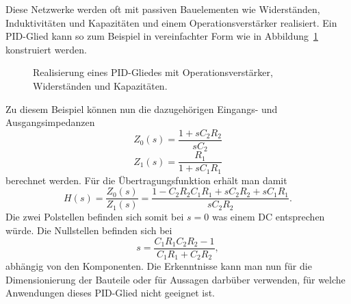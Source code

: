 Diese Netzwerke werden oft mit passiven Bauelementen wie Widerständen, Induktivitäten und Kapazitäten und einem Operationsverstärker realisiert.
%
%
%
%
%
Ein PID-Glied kann so zum Beispiel in vereinfachter Form wie in
%
Abbildung~\ref{pade:pid-circuit} konstruiert werden.
\begin{figure}
\centering
	\tikzset{>=latex}
\caption{Realisierung eines PID-Gliedes mit Operationsverstärker,
Widerständen und Kapazitäten.
\label{pade:pid-circuit}}
\end{figure}
Zu diesem Beispiel können nun die dazugehörigen Eingangs- und
Ausgangsimpedanzen
%
%
%
\begin{equation*}
Z_{0}(s)
=
\frac{1+s C_{2} R_{2}}{s C_{2}}
\end{equation*}
\begin{equation*}
Z_{1}(s)
=
\frac{R_{1}}{1+s C_{1} R_{1}}
\end{equation*}
berechnet werden.
Für die Übertragungsfunktion erhält man damit
%
\begin{equation*}
H(s)
=
\frac{Z_{0}(s)}{Z_{1}(s)}
=
\frac{1-C_2 R_2 C_1 R_1+ s C_2 R_2 +s C_1 R_1 }{s C_2 R_2}.
\end{equation*}
Die zwei Polstellen befinden sich somit bei $s=0$ was einem DC entsprechen würde.
Die Nullstellen befinden sich bei
\begin{equation*}
s
=
\frac{C_1 R_1 C_2 R_2 -1}{C_1 R_1 + C_2 R_2},
\end{equation*}
abhängig von den Komponenten.
Die Erkenntnisse kann man nun für die Dimensionierung der Bauteile
oder für Aussagen darbüber verwenden, für welche Anwendungen dieses PID-Glied
nicht geeignet ist.

